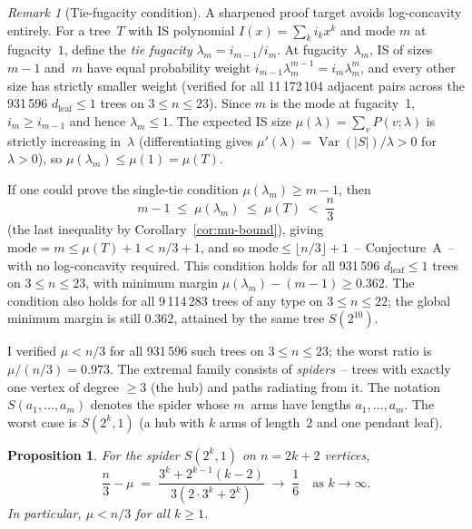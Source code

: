 \documentclass[12pt,oneside]{article}
\newtheorem{proposition}[theorem]{Proposition}
\theoremstyle{remark}
\newtheorem{remark}[theorem]{Remark}
\newcommand{\dleaf}{d_{\mathrm{leaf}}}    %
\begin{document}
\begin{remark}[Tie-fugacity condition]\label{rem:tie-fugacity-condition}
A sharpened proof target avoids log-concavity entirely.
For a tree~$T$ with IS polynomial $I(x) = \sum_k i_k x^k$ and mode $m$ at fugacity~$1$, define the \emph{tie fugacity} $\lambda_m = i_{m-1}/i_m$.
At fugacity~$\lambda_m$, IS of sizes $m-1$ and~$m$ have equal probability weight $i_{m-1}\lambda_m^{m-1} = i_m\lambda_m^m$, and every other size has strictly smaller weight (verified for all 11\,172\,104 adjacent pairs across the 931\,596 $\dleaf\le1$ trees on $3\le n\le23$).
Since $m$ is the mode at fugacity~1, $i_m \ge i_{m-1}$ and hence $\lambda_m \le 1$.
The expected IS size $\mu(\lambda) = \sum_v P(v;\lambda)$ is strictly increasing in~$\lambda$ (differentiating gives $\mu'(\lambda) = \operatorname{Var}(|S|)/\lambda > 0$ for $\lambda > 0$), so $\mu(\lambda_m) \le \mu(1) = \mu(T)$.

If one could prove the single-tie condition $\mu(\lambda_m) \ge m - 1$, then
\[
  m - 1 \;\le\; \mu(\lambda_m) \;\le\; \mu(T) \;<\; \frac{n}{3}
\]
(the last inequality by Corollary~\ref{cor:mu-bound}), giving $\mathrm{mode} = m \le \mu(T) + 1 < n/3 + 1$, and so $\mathrm{mode} \le \lfloor n/3 \rfloor + 1$~-- Conjecture~A~-- with no log-concavity required.
This condition holds for all 931\,596 $\dleaf \le 1$ trees on $3\le n\le23$, with minimum margin $\mu(\lambda_m) - (m-1) \ge 0.362$.
The condition also holds for all 9\,114\,283 trees of any type on $3\le n\le22$; the global minimum margin is still $0.362$, attained by the same tree $S(2^{10})$.
\end{remark}

I verified $\mu < n/3$ for all 931\,596 such trees on $3\le n\le23$; the worst ratio is $\mu / (n/3) = 0.973$.
The extremal family consists of \emph{spiders}~-- trees with exactly one vertex of degree $\ge 3$ (the hub) and paths radiating from it.
The notation $S(a_1, \dotsc, a_m)$ denotes the spider whose $m$~arms have lengths $a_1, \dotsc, a_m$.
The worst case is $S(2^k, 1)$ (a hub with $k$ arms of length~2 and one pendant leaf).

\begin{proposition}\label{prop:spider-mean}
  For the spider $S(2^k, 1)$ on $n = 2k + 2$ vertices,
  \[
    \frac{n}{3} - \mu \;=\; \frac{3^k + 2^{k-1}(k-2)}{3(2 \cdot 3^k + 2^k)} \;\longrightarrow\; \frac{1}{6}
    \quad\text{as } k \to \infty.
  \]
  In particular, $\mu < n/3$ for all $k \ge 1$.
\end{proposition}
\end{document}
